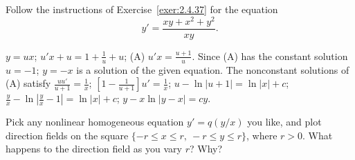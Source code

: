 \documentclass{ximera}
\begin{document}
\begin{problem}\label{exer:2.4.38}
Follow the instructions of Exercise~\ref{exer:2.4.37} for the equation
$$
y'=\frac{xy+x^2+y^2}{xy}.
$$



\begin{solution}
    $y=ux$;\;
$u'x+u=1+\frac{1}{ u}+u$;\;
(A) $u'x=\frac{u+1}{ u}$.
Since (A)  has the constant solution $u=-1$;
$y=-x$ is
a solution of the given equation. The nonconstant solutions of (A)
satisfy
$\frac{uu'}{ u+1}=\frac{1}{ x}$;\;
$\left[1-\frac{1 }{ u+1}\right]u'=\frac{1}{ x}$;\;
$u-\ln |u+1|=\ln |x|+c$;\;
$\frac{y}{ x}-\ln\left|\frac{y}{ x}-1\right|=\ln|x|+c$;\;
$y-x\ln|y-x|=cy$.
\end{solution}
\end{problem}

\begin{problem}\label{exer:2.4.39}
Pick any  nonlinear homogeneous equation $y'=q(y/x)$  you like, and
plot  direction fields on the square $\{-r\leq x\leq r,\ -r\leq y\leq r\}$,
where $r>0$. What happens to the direction field as you vary $r$?
Why?
\end{problem}
\end{document}

